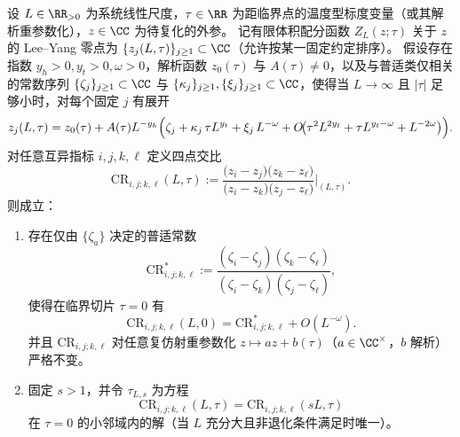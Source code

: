 \begin{theorem}\label{thm:xi-leyang-crossratio-demixing-crossing}
设 \(L\in\RR_{>0}\) 为系统线性尺度，\(\tau\in\RR\) 为距临界点的温度型标度变量（或其解析重参数化），\(z\in\CC\) 为待复化的外参。
记有限体积配分函数 \(Z_L(z;\tau)\) 关于 \(z\) 的 Lee--Yang 零点为 \(\{z_j(L,\tau)\}_{j\ge 1}\subset\CC\)（允许按某一固定约定排序）。
假设存在指数 \(y_h>0,y_t>0,\omega>0\)，解析函数 \(z_0(\tau)\) 与 \(A(\tau)\neq 0\)，以及与普适类仅相关的常数序列 \(\{\zeta_j\}_{j\ge 1}\subset\CC\) 与 \(\{\kappa_j\}_{j\ge 1},\{\xi_j\}_{j\ge 1}\subset\CC\)，使得当 \(L\to\infty\) 且 \(|\tau|\) 足够小时，对每个固定 \(j\) 有展开
\begin{equation}\label{eq:xi-leyang-fss-analytic-mixing}
z_j(L,\tau)
=
z_0(\tau)
+
A(\tau)L^{-y_h}\Bigl(
\zeta_j
+
\kappa_j\,\tau L^{y_t}
+
\xi_j\,L^{-\omega}
+
O\!\bigl(\tau^2L^{2y_t}+\tau L^{y_t-\omega}+L^{-2\omega}\bigr)
\Bigr).
\end{equation}
对任意互异指标 \(i,j,k,\ell\) 定义四点交比
\begin{equation}\label{eq:xi-leyang-crossratio-def}
\mathrm{CR}_{i,j;k,\ell}(L,\tau)
:=
\frac{\bigl(z_i-z_j\bigr)\bigl(z_k-z_\ell\bigr)}{\bigl(z_i-z_k\bigr)\bigl(z_j-z_\ell\bigr)}\Bigg|_{(L,\tau)}.
\end{equation}
则成立：
\begin{enumerate}
  \item 存在仅由 \(\{\zeta_a\}\) 决定的普适常数
  \begin{equation}\label{eq:xi-leyang-crossratio-universal}
  \mathrm{CR}_{i,j;k,\ell}^{\ast}
  :=
  \frac{(\zeta_i-\zeta_j)(\zeta_k-\zeta_\ell)}{(\zeta_i-\zeta_k)(\zeta_j-\zeta_\ell)},
  \end{equation}
  使得在临界切片 \(\tau=0\) 有
  \begin{equation}\label{eq:xi-leyang-crossratio-critical-limit}
  \mathrm{CR}_{i,j;k,\ell}(L,0)=\mathrm{CR}_{i,j;k,\ell}^{\ast}+O(L^{-\omega}).
  \end{equation}
  并且 \(\mathrm{CR}_{i,j;k,\ell}\) 对任意复仿射重参数化 \(z\mapsto az+b(\tau)\)（\(a\in\CC^{\times}\)，\(b\) 解析）严格不变。
  \item 固定 \(s>1\)，并令 \(\tau_{L,s}\) 为方程
  \begin{equation}\label{eq:xi-leyang-crossratio-crossing-eq}
  \mathrm{CR}_{i,j;k,\ell}(L,\tau)=\mathrm{CR}_{i,j;k,\ell}(sL,\tau)
  \end{equation}
  在 \(\tau=0\) 的小邻域内的解（当 \(L\) 充分大且非退化条件满足时唯一）。

\end{enumerate}
\end{theorem}
